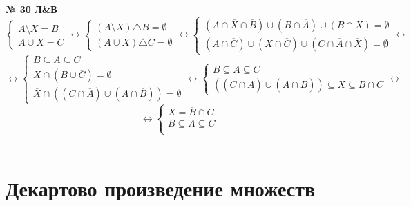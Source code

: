 \documentclass[12pt]{article}
\begin{document}
\vspace{.5cm}
{
	{\textbf{№ 30 Л\&В} \vspace{.5cm}\\}
	\begin{equation*}
		\begin{cases}
			A \setminus	X = B\\
			A \cup X = C
		\end{cases} \leftrightarrow
		\begin{cases}
			(A \setminus X) \triangle B = \emptyset\\
			(A \cup X) \triangle C = \emptyset
		\end{cases} \leftrightarrow
		\begin{cases}
			(A \cap \overline{X} \cap \overline{B}) \cup (B \cap \overline{A}) \cup (B \cap X) = \emptyset\\
			(A \cap \overline{C}) \cup (X \cap \overline{C}) \cup (C \cap \overline{A} \cap \overline{X}) = \emptyset
		\end{cases}\leftrightarrow
	\end{equation*}
	\begin{equation*}
		\leftrightarrow
		\begin{cases}
			B \subseteq A \subseteq C\\
			X \cap (B \cup \overline{C}) = \emptyset\\
			\overline{X} \cap ((C \cap \overline{A}) \cup (A \cap \overline{B})) = \emptyset
		\end{cases} \leftrightarrow
		\begin{cases}
			B \subseteq A \subseteq C\\
			((C \cap \overline{A}) \cup (A \cap \overline{B})) \subseteq X \subseteq \overline{B} \cap C
		\end{cases}  \leftrightarrow
	\end{equation*}
	\begin{equation*}
		\leftrightarrow
		\begin{cases}
			X = \overline{B} \cap C\\
			B \subseteq A \subseteq C\\
		\end{cases}
	\end{equation*}
}
\vspace{1cm}\\
\section{Декартово произведение множеств}
\end{document}
